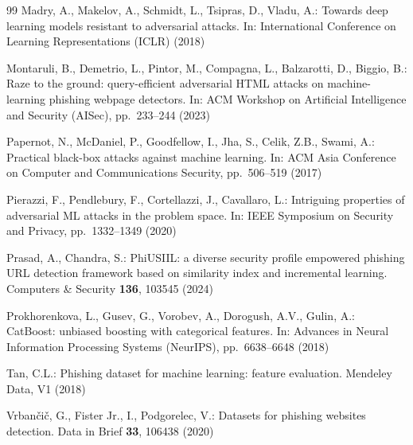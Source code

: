 \documentclass[runningheads]{llncs}
\begin{document}
\begin{thebibliography}{99}
Madry, A., Makelov, A., Schmidt, L., Tsipras, D., Vladu, A.: Towards deep
learning models resistant to adversarial attacks. In: International Conference on
Learning Representations (ICLR) (2018)

Montaruli, B., Demetrio, L., Pintor, M., Compagna, L., Balzarotti, D., Biggio,
B.: Raze to the ground: query-efficient adversarial HTML attacks on
machine-learning phishing webpage detectors. In: ACM Workshop on Artificial
Intelligence and Security (AISec), pp.~\mbox{233--244} (2023)

Papernot, N., McDaniel, P., Goodfellow, I., Jha, S., Celik, Z.B., Swami, A.:
Practical black-box attacks against machine learning. In: ACM Asia Conference on
Computer and Communications Security, pp.~\mbox{506--519} (2017)

Pierazzi, F., Pendlebury, F., Cortellazzi, J., Cavallaro, L.: Intriguing
properties of adversarial ML attacks in the problem space. In: IEEE Symposium on
Security and Privacy, pp.~\mbox{1332--1349} (2020)

Prasad, A., Chandra, S.: PhiUSIIL: a diverse security profile empowered phishing
URL detection framework based on similarity index and incremental learning.
Computers \& Security \textbf{136}, 103545 (2024)

Prokhorenkova, L., Gusev, G., Vorobev, A., Dorogush, A.V., Gulin, A.: CatBoost:
unbiased boosting with categorical features. In: Advances in Neural Information
Processing Systems (NeurIPS), pp.~\mbox{6638--6648} (2018)

Tan, C.L.: Phishing dataset for machine learning: feature evaluation. Mendeley
Data, V1 (2018)

Vrban\v{c}i\v{c}, G., Fister Jr., I., Podgorelec, V.: Datasets for phishing websites
detection. Data in Brief \textbf{33}, 106438 (2020)

\end{thebibliography}
\end{document}
